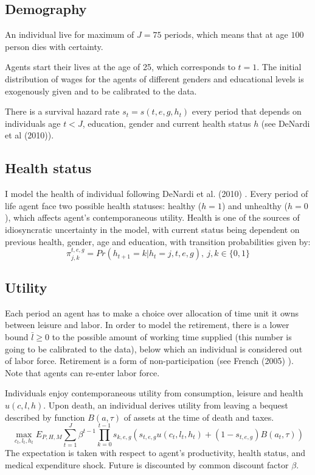 \documentclass[
10pt, %
a4paper, %
oneside, %
headinclude,footinclude, %
BCOR5mm, %
]{scrartcl}
\begin{document}
\subsection{Demography}
An individual live for maximum of $J = 75$ periods, which means that at age $100$ person dies with certainty.

Agents start their lives at the age of 25, which corresponds to $t = 1$. The initial distribution of wages for the agents of different genders and educational levels is exogenously given and to be calibrated to the data.

 There is a survival hazard rate  $s_t = s(t,e,g,h_t)$ every period that depends on individuals age $t<J$, education, gender and current health status $h$ (see DeNardi et al (2010)\cite{DeNardi2010}). 

\subsection{Health status}
I model the health of individual following DeNardi et al. (2010) \cite{DeNardi2010}. Every period of life agent face two possible health statuses: healthy ($h=1$) and unhealthy ($h=0$), which affects agent's contemporaneous utility. Health is one of the sources of idiosyncratic uncertainty in the model, with current status being dependent on previous health, gender, age and education, with transition probabilities given by:
\begin{equation*}
\pi_{j,k}^{t,e,g} = Pr(h_{t+1} = k|h_t= j, t,e,g), \ j,k\in\{0,1\}
\end{equation*}

\subsection{Utility}
Each period an agent has to make a choice over allocation of time unit it owns between leisure and labor. In order to model the retirement, there is a lower bound $\bar{l}\ge0$ to the possible amount of working time supplied (this number is going to be calibrated to the data), below which an individual is considered out of labor force. Retirement is a form of non-participation (see French (2005) \cite{French2005}). Note that agents can re-enter labor force. 

 Individuals enjoy contemporaneous utility from consumption, leisure and health $u(c,l,h)$. Upon death, an individual derives utility from leaving a bequest described by function $B(a,\tau)$ of assets at the time of death and taxes.
\begin{equation}
\max_{c_t,l_t,h_t}E_{P,H,M}\sum_{t=1}^J\beta^{t-1}\prod_{k=0}^{t-1}s_{k,e,g}\left(s_{t,e,g}u(c_t,l_t,h_t)+(1-s_{t,e,g})B(a_t,\tau)\right)
\end{equation}
The expectation is taken with respect to agent's productivity, health status, and medical expenditure shock. Future is discounted by common discount factor $\beta$. 
\end{document}
